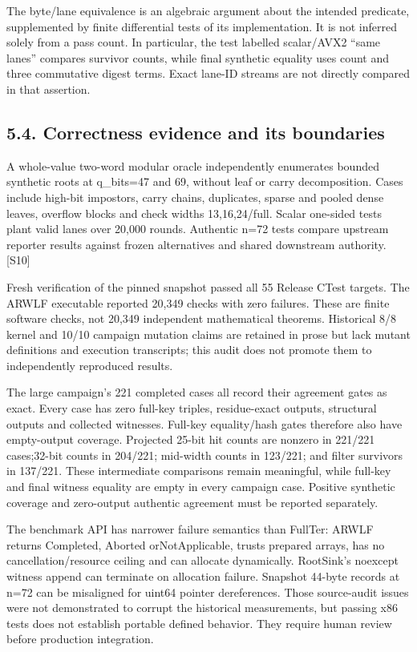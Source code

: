 \documentclass[10pt,letterpaper]{article}
\begin{document}
The byte/lane equivalence is an algebraic argument about the intended predicate, supplemented by finite differential tests of its implementation. It is not inferred solely from a pass count. In particular, the test labelled scalar/AVX2 ``same lanes'' compares survivor counts, while final synthetic equality uses count and three commutative digest terms. Exact lane-ID streams are not directly compared in that assertion.


\subsection*{5.4. Correctness evidence and its boundaries}

A whole-value two-word modular oracle independently enumerates bounded synthetic roots at q\_bits=47 and 69, without leaf or carry decomposition. Cases include high-bit impostors, carry chains, duplicates, sparse and pooled dense leaves, overflow blocks and check widths 13,16,24/full. Scalar one-sided tests plant valid lanes over 20,000 rounds. Authentic n=72 tests compare upstream reporter results against frozen alternatives and shared downstream authority. [S10]


Fresh verification of the pinned snapshot passed all 55 Release CTest targets. The ARWLF executable reported 20,349 checks with zero failures. These are finite software checks, not 20,349 independent mathematical theorems. Historical 8/8 kernel and 10/10 campaign mutation claims are retained in prose but lack mutant definitions and execution transcripts; this audit does not promote them to independently reproduced results.


The large campaign's 221 completed cases all record their agreement gates as exact. Every case has zero full-key triples, residue-exact outputs, structural outputs and collected witnesses. Full-key equality/hash gates therefore also have empty-output coverage. Projected 25-bit hit counts are nonzero in 221/221 cases;32-bit counts in 204/221; mid-width counts in 123/221; and filter survivors in 137/221. These intermediate comparisons remain meaningful, while full-key and final witness equality are empty in every campaign case. Positive synthetic coverage and zero-output authentic agreement must be reported separately.


The benchmark API has narrower failure semantics than FullTer: ARWLF returns Completed, Aborted orNotApplicable, trusts prepared arrays, has no cancellation/resource ceiling and can allocate dynamically. RootSink's noexcept witness append can terminate on allocation failure. Snapshot 44-byte records at n=72 can be misaligned for uint64 pointer dereferences. Those source-audit issues were not demonstrated to corrupt the historical measurements, but passing x86 tests does not establish portable defined behavior. They require human review before production integration.
\end{document}
